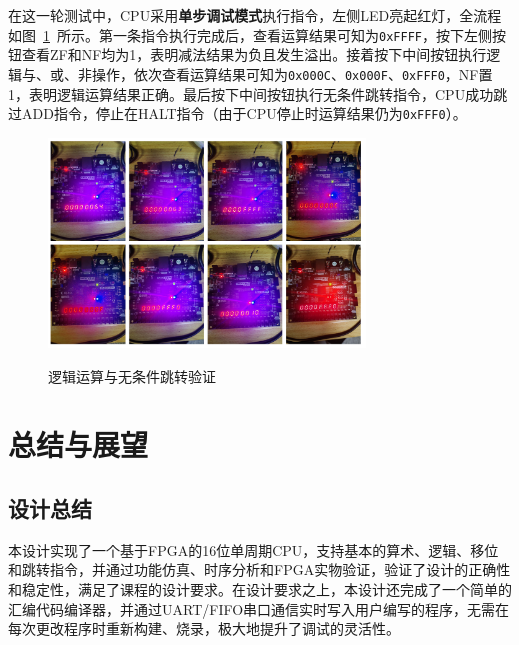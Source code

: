 \documentclass[lang=cn,a4paper,newtx]{elegantpaper}
\begin{document}
在这一轮测试中，CPU采用\textbf{单步调试模式}执行指令，左侧LED亮起红灯，全流程如图~\ref{fig:FPGA_logic}~所示。第一条指令执行完成后，查看运算结果可知为\texttt{0xFFFF}，按下左侧按钮查看ZF和NF均为1，表明减法结果为负且发生溢出。接着按下中间按钮执行逻辑与、或、非操作，依次查看运算结果可知为\texttt{0x000C}、\texttt{0x000F}、\texttt{0xFFF0}，NF置1，表明逻辑运算结果正确。最后按下中间按钮执行无条件跳转指令，CPU成功跳过ADD指令，停止在HALT指令（由于CPU停止时运算结果仍为\texttt{0xFFF0}）。
\begin{figure}[htbp]
  \centering
  \caption{逻辑运算与无条件跳转验证}
  \includegraphics[width = 0.75\textwidth]{figure/logic_verification.pdf}
  \label{fig:FPGA_logic}
\end{figure}

\section{总结与展望}
\subsection{设计总结}
本设计实现了一个基于FPGA的16位单周期CPU，支持基本的算术、逻辑、移位和跳转指令，并通过功能仿真、时序分析和FPGA实物验证，验证了设计的正确性和稳定性，满足了课程的设计要求。在设计要求之上，本设计还完成了一个简单的汇编代码编译器，并通过UART/FIFO串口通信实时写入用户编写的程序，无需在每次更改程序时重新构建、烧录，极大地提升了调试的灵活性。
\end{document}
